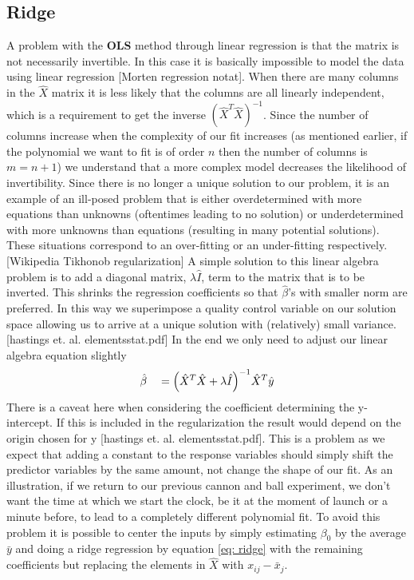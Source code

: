 \subsection{Ridge}
A problem with the \textbf{OLS} method through linear regression is that the matrix is not necessarily invertible. In this case it is basically impossible to model the data using linear regression [Morten regression notat]. When there are many columns in the $\hat{X}$ matrix it is less likely that the columns are all linearly independent, which is a requirement to get the inverse $(\hat{X}^T\hat{X})^{-1}$. Since the number of columns increase when the complexity of our fit increases (as mentioned earlier, if the polynomial we want to fit is of order $n$ then the number of columns is $m=n+1$) we understand that a more complex model decreases the likelihood of invertibility. Since there is no longer a unique solution to our problem, it is an example of an ill-posed problem that is either overdetermined with more equations than unknowns (oftentimes leading to no solution) or underdetermined with more unknowns than equations (resulting in many potential solutions). These situations correspond to an over-fitting or an under-fitting respectively. [Wikipedia Tikhonob regularization] A simple solution to this linear algebra problem is to add a diagonal matrix, $\lambda \hat{I}$, term to the matrix that is to be inverted. This shrinks the regression coefficients so that $\hat{\beta}$'s with smaller norm are preferred. In this way we superimpose a quality control variable on our solution space allowing us to arrive at a unique solution with (relatively) small variance. [hastings et. al. elementsstat.pdf]
In the end we only need to adjust our linear algebra equation slightly
\begin{equation}\label{eq: ridge}
	\hat{\beta} \quad= \qty(\hat{X}^T\hat{X}+\lambda \hat{I})^{-1}\hat{X}^T\hat{y}
\end{equation}
There is a caveat here when considering the coefficient determining the y-intercept. If this is included in the regularization the result would depend on the origin chosen for y [hastings et. al. elementsstat.pdf]. This is a problem as we expect that adding a constant to the response variables should simply shift the predictor variables by the same amount, not change the shape of our fit. As an illustration, if we return to our previous cannon and ball experiment, we don't want the time at which we start the clock, be it at the moment of launch or a minute before, to lead to a completely different polynomial fit. To avoid this problem it is possible to center the inputs by simply estimating $\beta_0$ by the average $\bar{y}$ and doing a ridge regression by equation \ref{eq: ridge} with the remaining coefficients but replacing the elements in $\hat{X}$ with $x_{ij}-\bar{x}_j$.
